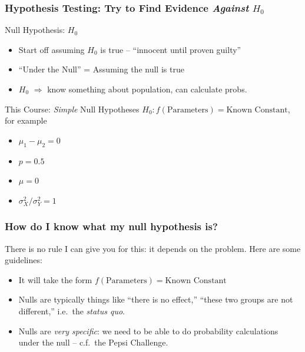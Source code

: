 \begin{frame}
	\frametitle{Hypothesis Testing: Try to 
	Find Evidence \emph{Against} $H_0$}
\begin{block}
	{Null Hypothesis: $H_0$}
	\begin{itemize}
		\item Start off assuming $H_0$ is true --
		 ``innocent until proven guilty''
		\item ``Under the Null'' = Assuming the null is true
		\item $H_0$ $\Rightarrow$ know something about population, can calculate probs.
	\end{itemize}
\end{block}
\begin{alertblock}
	{This Course: \emph{Simple} Null Hypotheses}
	$H_0\colon f(\mbox{Parameters}) = \mbox{Known Constant}$, for example
	\begin{itemize}
		\item $\mu_1 - \mu_2 = 0$
		\item $p = 0.5$
		\item $\mu = 0$
		\item $\sigma^2_X/\sigma^2_Y = 1$
	\end{itemize}
\end{alertblock}
\end{frame}
\begin{frame}
	\frametitle{How do I know what my null hypothesis is?}
	There is no rule I can give you for this: it depends on the problem. Here are some guidelines:
	\begin{itemize}
		\item It will take the form $f(\mbox{Parameters}) = \mbox{Known Constant}$
		\item Nulls are typically things like ``there is no effect,'' ``these two groups are not different,'' i.e.\ the \emph{status quo}. 
		\item Nulls are \emph{very specific}: we need to be able to do probability calculations under the null -- c.f.\ the Pepsi Challenge.
	\end{itemize}
\end{frame}
